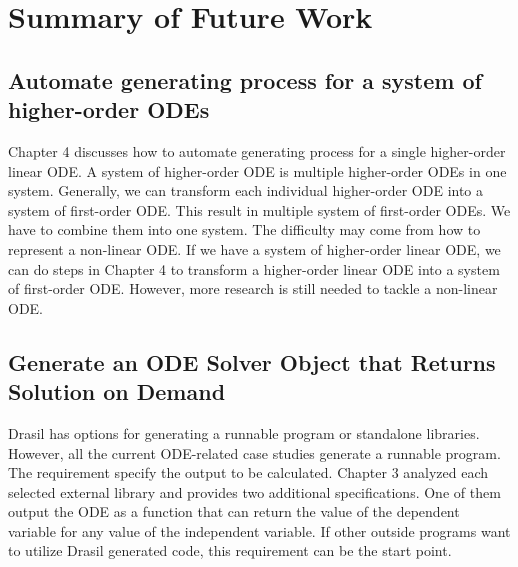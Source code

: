 \chapter{Summary of Future Work}

\section{Automate generating process for a system of higher-order ODEs}
Chapter 4 discusses how to automate generating process for a single higher-order linear ODE. A system of higher-order ODE is multiple higher-order ODEs in one system. Generally, we can transform each individual higher-order ODE into a system of first-order ODE. This result in multiple system of first-order ODEs. We have to combine them into one system. The difficulty may come from how to represent a non-linear ODE. If we have a system of higher-order linear ODE, we can do steps in Chapter 4 to transform a higher-order linear ODE into a system of first-order ODE. However, more research is still needed to tackle a non-linear ODE.

\section{Generate an ODE Solver Object that Returns Solution on Demand}
Drasil has options for generating a runnable program or standalone libraries. However, all the current ODE-related case studies generate a runnable program. The requirement specify the output to be calculated. Chapter 3 analyzed each selected external library and provides two additional specifications. One of them output the ODE as a function that can return the value of the dependent variable for any value of the independent variable. If other outside programs want to utilize Drasil generated code, this requirement can be the start point.




